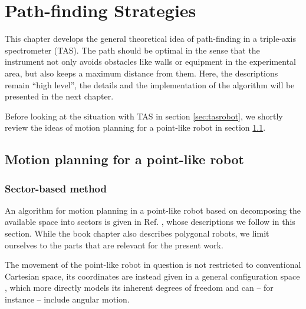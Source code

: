 %
%

\chapter{Path-finding Strategies}
\label{ch:paths}

This chapter develops the general theoretical idea of path-finding in a 
triple-axis spectrometer (TAS).
The path should be optimal in the sense that the instrument not only avoids 
obstacles like walls or equipment in the experimental area, but also keeps a 
maximum distance from them. 
Here, the descriptions remain ``high level'', the details and the implementation 
of the algorithm will be presented in the next chapter.

Before looking at the situation with TAS in section \ref{sec:tasrobot}, we shortly 
review the ideas of motion planning for a point-like robot in section \ref{sec:pointrobot}.



\section{Motion planning for a point-like robot}
\label{sec:pointrobot}

\subsection{Sector-based method}
An algorithm for motion planning in a point-like robot based on decomposing the 
available space into sectors is given in Ref. \cite[Ch. 13, pp. 283-306]{Berg2008}, 
whose descriptions we follow in this section. 
While the book chapter also describes polygonal robots, we limit ourselves to the 
parts that are relevant for the present work.

The movement of the point-like robot in question is not restricted to conventional 
Cartesian space, its coordinates are instead given in a general configuration space
\cite[Ch. 13.1, pp. 284-286]{Berg2008}, which more directly models its inherent 
degrees of freedom and can -- for instance -- include angular motion.

